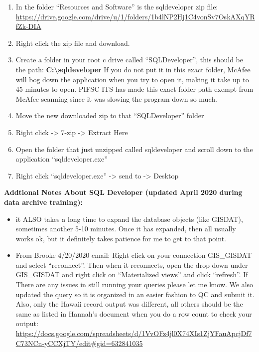 \documentclass[
]{book}
\begin{document}
\begin{enumerate}
\def\labelenumi{\arabic{enumi}.}
\item
  In the folder ``Resources and Software'' is the sqldeveloper zip file: \url{https://drive.google.com/drive/u/1/folders/1b4lNP2Hj1C4vonSv7OskAXqYRfZk-DIA}
\item
  Right click the zip file and download.
\item
  Create a folder in your root c drive called ``SQLDeveloper'', this should be the path: \textbf{C:\textbackslash sqldeveloper} If you do not put it in this exact folder, McAfee will bog down the application when you try to open it, making it take up to 45 minutes to open. PIFSC ITS has made this exact folder path exempt from McAfee scanning since it was slowing the program down so much.
\item
  Move the new downloaded zip to that ``SQLDeveloper'' folder
\item
  Right click -\textgreater{} 7-zip -\textgreater{} Extract Here
\item
  Open the folder that just unzipped called sqldeveloper and scroll down to the application ``sqldeveloper.exe''
\item
  Right click ``sqldeveloper.exe'' -\textgreater{} send to -\textgreater{} Desktop
\end{enumerate}

\textbf{Addtional Notes About SQL Developer (updated April 2020 during data archive training):}

\begin{itemize}
\item
  it ALSO takes a long time to expand the database objects (like GISDAT), sometimes another 5-10 minutes. Once it has expanded, then all usually works ok, but it definitely takes patience for me to get to that point.
\item
  From Brooke 4/20/2020 email: Right click on your connection GIS\_GISDAT and select ``reconnect''. Then when it reconnects, open the drop down under GIS\_GISDAT and right click on ``Materialized views'' and click ``refresh''.
  If There are any issues in still running your queries please let me know. We also updated the query so it is organized in an easier fashion to QC and submit it.
  Also, only the Hawaii record output was different, all others should be the same as listed in Hannah's document when you do a row count to check your output:
  \url{https://docs.google.com/spreadsheets/d/1VvOFz4jl0X74XIs1ZjYFauApcjDf7C73NCn-yCCXjTY/edit\#gid=632841035}
\end{itemize}
\end{document}
